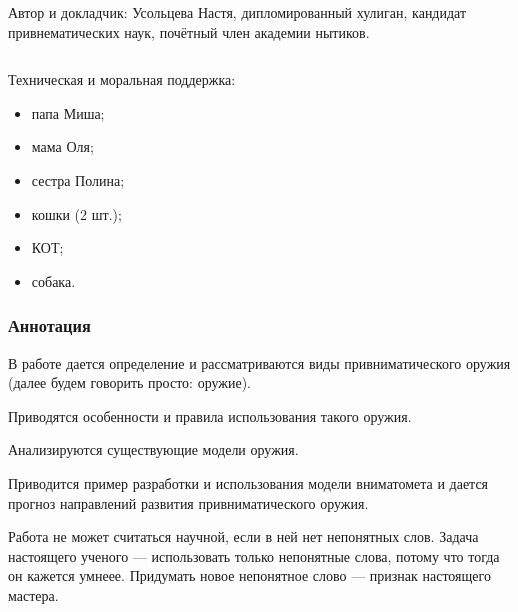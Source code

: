 \begin{frame}
\begin{columns}
            \alert{Автор и докладчик}: Усольцева Настя, дипломированный хулиган, кандидат привнематических наук, почётный член академии нытиков.
    \end{columns}    
    
    \par\bigskip
    
    \alert{Техническая и моральная поддержка}:
    \begin{itemize}
        \item папа Миша;
        \item мама Оля;
        \item сестра Полина;
        \item кошки (2 шт.);
        \item \alert{КОТ};
        \item собака.
    \end{itemize}
    
\end{frame}

\begin{frame}
    \frametitle{Аннотация}
    
    В работе дается определение и рассматриваются виды \alert{привниматического оружия} (далее будем говорить просто: \alert{оружие}). 
    
    \par\bigskip
    
    Приводятся \alert{особенности и правила} использования такого оружия. 
    
    \par\bigskip

    Анализируются \alert{существующие модели} оружия. 

    \par\bigskip
    
    Приводится пример разработки и использования модели вниматомета \alert{\myDevice} и дается прогноз направлений развития привниматического оружия.
\end{frame}

Работа не может считаться научной, если в ней нет непонятных слов. Задача настоящего ученого --- использовать только непонятные слова, потому что тогда он кажется умнеее. Придумать новое непонятное слово --- признак настоящего мастера.
    
